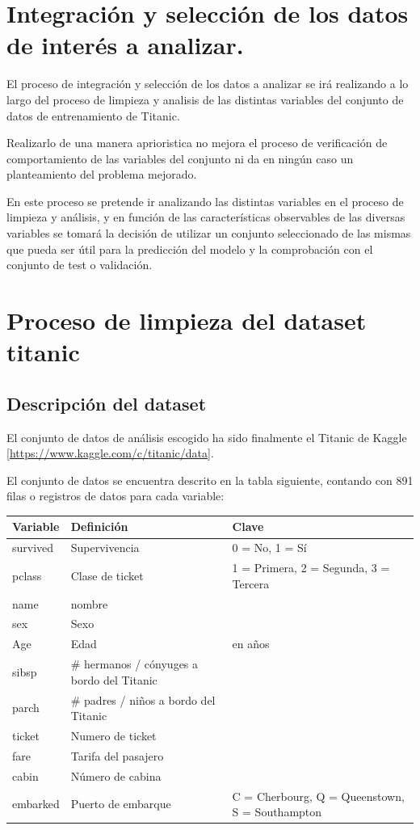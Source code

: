 \documentclass[]{article}
\begin{document}
\section{Integración y selección de los datos de interés a
analizar.}\label{integracion-y-seleccion-de-los-datos-de-interes-a-analizar.}

El proceso de integración y selección de los datos a analizar se irá
realizando a lo largo del proceso de limpieza y analisis de las
distintas variables del conjunto de datos de entrenamiento de Titanic.

Realizarlo de una manera aprioristica no mejora el proceso de
verificación de comportamiento de las variables del conjunto ni da en
ningún caso un planteamiento del problema mejorado.

En este proceso se pretende ir analizando las distintas variables en el
proceso de limpieza y análisis, y en función de las características
observables de las diversas variables se tomará la decisión de utilizar
un conjunto seleccionado de las mismas que pueda ser útil para la
predicción del modelo y la comprobación con el conjunto de test o
validación.

\section{\texorpdfstring{Proceso de limpieza del dataset
\textbf{titanic}}{Proceso de limpieza del dataset titanic}}\label{proceso-de-limpieza-del-dataset-titanic}

\subsection{Descripción del dataset}\label{descripcion-del-dataset}

El conjunto de datos de análisis escogido ha sido finalmente el Titanic
de Kaggle {[}\url{https://www.kaggle.com/c/titanic/data}{]}.

El conjunto de datos se encuentra descrito en la tabla siguiente,
contando con 891 filas o registros de datos para cada variable:

\begin{longtable}[]{@{}lll@{}}
\toprule
Variable & Definición & Clave\tabularnewline
\midrule
\endhead
survived & Supervivencia & 0 = No, 1 = Sí\tabularnewline
pclass & Clase de ticket & 1 = Primera, 2 = Segunda, 3 =
Tercera\tabularnewline
name & nombre &\tabularnewline
sex & Sexo &\tabularnewline
Age & Edad & en años\tabularnewline
sibsp & \# hermanos / cónyuges a bordo del Titanic &\tabularnewline
parch & \# padres / niños a bordo del Titanic &\tabularnewline
ticket & Numero de ticket &\tabularnewline
fare & Tarifa del pasajero &\tabularnewline
cabin & Número de cabina &\tabularnewline
embarked & Puerto de embarque & C = Cherbourg, Q = Queenstown, S =
Southampton\tabularnewline
\bottomrule
\end{longtable}
\end{document}
